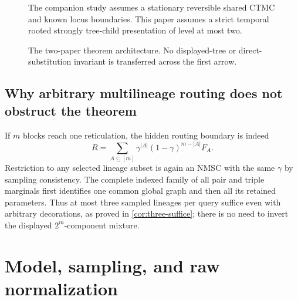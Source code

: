 \documentclass[11pt]{article}
\newcommand{\Qraw}{\mathcal Q^{\mathrm{NMSC,raw}}_2}
\begin{document}
\begin{figure}[ht]
\centering
{}
\par\smallskip
\begin{minipage}{.92\linewidth}\scriptsize
The companion study \citep{KriebelNMSCCore2026} assumes a stationary reversible shared CTMC and known locus boundaries.
This paper assumes a strict temporal rooted strongly tree-child presentation of
level at most two.
\end{minipage}
\caption{The two-paper theorem architecture.  No displayed-tree or direct-substitution invariant is transferred across the first arrow.}
\label{fig:scope}
\end{figure}

\subsection{Why arbitrary multilineage routing does not obstruct the theorem}
If $m$ blocks reach one reticulation, the hidden routing boundary is indeed
\[
 R=\sum_{A\subseteq[m]}\gamma^{|A|}(1-\gamma)^{m-|A|}F_A.
\]
Restriction to any selected lineage subset is again an NMSC with the same $\gamma$ by sampling consistency. The complete indexed family of all pair and triple marginals first identifies one common global graph and then all its retained parameters. Thus at most three sampled lineages per query suffice even with arbitrary decorations, as proved in \cref{cor:three-suffice}; there is no need to invert the displayed $2^m$-component mixture.

\section{Model, sampling, and raw normalization}
\label{sec:model}
\end{document}
